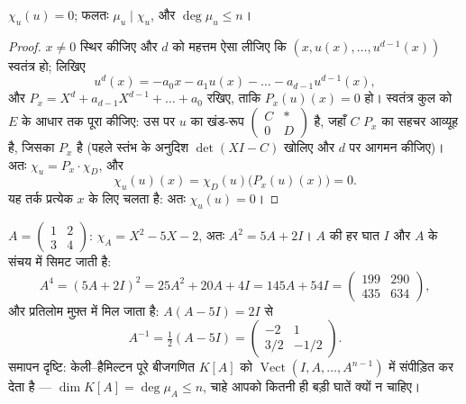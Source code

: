 \begin{theorem}[केली--हैमिल्टन]\label{thm:b2:reduction:cayleyhamilton}
$\chi_u(u) = 0$; फलतः $\mu_u \mid \chi_u$, और $\deg \mu_u
\leq n$।
\end{theorem}

\begin{proof}
$x \neq 0$ स्थिर कीजिए और $d$ को महत्तम ऐसा लीजिए कि $(x, u(x), \dots,
u^{d-1}(x))$ स्वतंत्र हो; लिखिए
\[
u^d(x) = -a_0 x - a_1 u(x) - \dots - a_{d-1}u^{d-1}(x),
\]
और $P_x = X^d + a_{d-1}X^{d-1} + \dots + a_0$ रखिए, ताकि $P_x(u)(x) =
0$ हो। स्वतंत्र कुल को $E$ के आधार तक पूरा कीजिए:
उस पर $u$ का खंड-रूप $\begin{pmatrix} C & \ast\\ 0 & D\end{pmatrix}$ है, जहाँ $C$ $P_x$ का सहचर आव्यूह है, जिसका
 $P_x$ है (पहले स्तंभ के अनुदिश $\det(XI - C)$ खोलिए और $d$ पर
आगमन कीजिए)। अतः $\chi_u = P_x \cdot \chi_D$, और
\[
\chi_u(u)(x) = \chi_D(u)\bigl(P_x(u)(x)\bigr) = 0 .
\]
यह तर्क प्रत्येक $x$ के लिए चलता है: अतः $\chi_u(u) = 0$।
\end{proof}

\begin{example}[केली--हैमिल्टन काम पर]\label{ex:b2:reduction:chwork}
$A = \begin{pmatrix} 1 & 2\\ 3 & 4\end{pmatrix}$: $\chi_A = X^2 -
5X - 2$, अतः $A^2 = 5A + 2I$। $A$ की हर घात $I$ और $A$ के संचय में सिमट जाती है:
\[
A^4 = (5A + 2I)^2 = 25A^2 + 20A + 4I = 145A + 54I =
\begin{pmatrix} 199 & 290\\ 435 & 634\end{pmatrix},
\]
और प्रतिलोम मुफ़्त में मिल जाता है: $A(A - 5I) = 2I$ से
\[
A^{-1} = \tfrac12(A - 5I)
= \begin{pmatrix} -2 & 1\\ 3/2 & -1/2\end{pmatrix}.
\]
समापन दृष्टि: केली--हैमिल्टन पूरे बीजगणित $K[A]$ को $\operatorname{Vect}(I, A, \dots, A^{n-1})$ में संपीड़ित कर
देता है --- $\dim K[A] = \deg\mu_A \leq n$, चाहे आपको कितनी ही बड़ी घातें क्यों न चाहिए।
\end{example}

